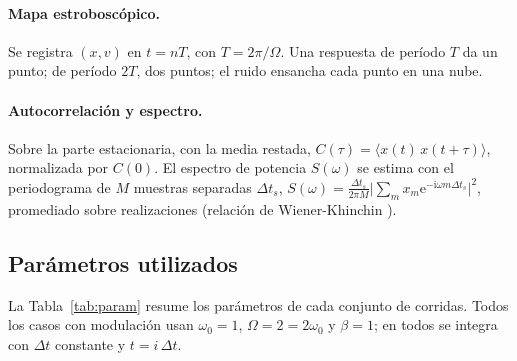 \documentclass[12pt,a4paper]{article}
\newcommand{\ee}{\mathrm{e}}
\newcommand{\media}[1]{\langle #1\rangle}
\begin{document}
\paragraph{Mapa estroboscópico.} Se registra $(x,v)$ en $t=nT$, con $T=2\pi/\Omega$. Una respuesta de período $T$ da un punto; de período $2T$, dos puntos; el ruido ensancha cada punto en una nube.

\paragraph{Autocorrelación y espectro.} Sobre la parte estacionaria, con la media restada, $C(\tau)=\media{x(t)\,x(t+\tau)}$, normalizada por $C(0)$. El espectro de potencia $S(\omega)$ se estima con el periodograma de $M$ muestras separadas $\Delta t_s$, $S(\omega)=\frac{\Delta t_s}{2\pi M}\big|\sum_{m}x_m\ee^{-\mathrm{i}\omega m\Delta t_s}\big|^{2}$, promediado sobre realizaciones (relación de Wiener-Khinchin \cite{gardiner2009}).

\subsection{Parámetros utilizados}

La Tabla~\ref{tab:param} resume los parámetros de cada conjunto de corridas. Todos los casos con modulación usan $\omega_0=1$, $\Omega=2=2\omega_0$ y $\beta=1$; en todos se integra con $\Delta t$ constante y $t=i\,\Delta t$.
\end{document}
